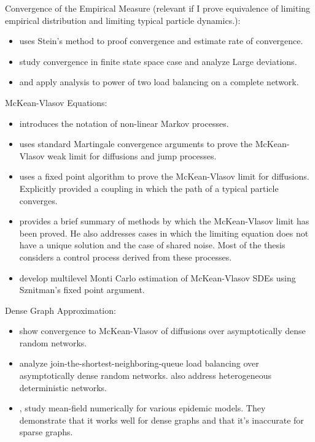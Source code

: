 \documentclass[12pt]{article}
\begin{document}
Convergence of the Empirical Measure (relevant if I prove equivalence of limiting empirical distribution and limiting typical particle dynamics.):

\begin{itemize}
\item \cite{Yin15} uses Stein's method to proof convergence and estimate rate of convergence.

\item \cite{DupRamWu16} study convergence in finite state space case and analyze Large deviations.

\item \cite{VveDobKar96} and \cite{Mit01} apply analysis to power of two load balancing on a complete network. 
\end{itemize}

McKean-Vlasov Equations:

\begin{itemize}
\item \cite{Mck66} introduces the notation of non-linear Markov processes.

\item \cite{Oel84} uses standard Martingale convergence arguments to prove the McKean-Vlasov weak limit for diffusions and jump processes.

\item \cite{Szn91} uses a fixed point algorithm to prove the McKean-Vlasov limit for diffusions. Explicitly provided a coupling in which the path of a typical particle converges.

\item \cite{Lac15} provides a brief summary of methods by which the McKean-Vlasov limit has been proved. He also addresses cases in which the limiting equation does not have a unique solution and the case of shared noise. Most of the thesis considers a control process derived from these processes.

\item \cite{SzpTanTse17} develop multilevel Monti Carlo estimation of McKean-Vlasov SDEs using Sznitman's fixed point argument.
\end{itemize}

Dense Graph Approximation:

\begin{itemize}
\item \cite{BhaBudWu17} show convergence to McKean-Vlasov of diffusions over asymptotically dense random networks.

\item \cite{MukBorLee17} analyze join-the-shortest-neighboring-queue load balancing over asymptotically dense random networks. \cite{BudMukWu17} also address heterogeneous deterministic networks.

\item \cite{MieBov15},\cite{GreKisKao06} study mean-field numerically for various epidemic models. They demonstrate that it works well for dense graphs and that it's inaccurate for sparse graphs.
\end{itemize}
\end{document}

